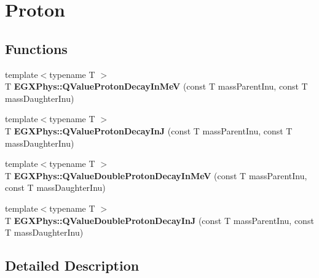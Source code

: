 \hypertarget{group___e_g_x_phys-_q_value-_proton}{}\section{Proton}
\label{group___e_g_x_phys-_q_value-_proton}
\subsection*{Functions}
\begin{DoxyCompactItemize}
\item 
\mbox{\label{group___e_g_x_phys-_q_value-_proton_gadb53ee1b917c5a6a5d17443872f72c04}} 
{\footnotesize template$<$typename T $>$ }\\T {\bfseries E\+G\+X\+Phys\+::\+Q\+Value\+Proton\+Decay\+In\+MeV} (const T mass\+Parent\+Inu, const T mass\+Daughter\+Inu)
\item 
\mbox{\label{group___e_g_x_phys-_q_value-_proton_ga60619e9c1249b20fa96fc24b27a117bb}} 
{\footnotesize template$<$typename T $>$ }\\T {\bfseries E\+G\+X\+Phys\+::\+Q\+Value\+Proton\+Decay\+InJ} (const T mass\+Parent\+Inu, const T mass\+Daughter\+Inu)
\item 
\mbox{\label{group___e_g_x_phys-_q_value-_proton_ga1c6352b3ffeb132afe092dd6e9249dde}} 
{\footnotesize template$<$typename T $>$ }\\T {\bfseries E\+G\+X\+Phys\+::\+Q\+Value\+Double\+Proton\+Decay\+In\+MeV} (const T mass\+Parent\+Inu, const T mass\+Daughter\+Inu)
\item 
\mbox{\label{group___e_g_x_phys-_q_value-_proton_ga2e778fe3f26cf7f03ea1b5734b9564d8}} 
{\footnotesize template$<$typename T $>$ }\\T {\bfseries E\+G\+X\+Phys\+::\+Q\+Value\+Double\+Proton\+Decay\+InJ} (const T mass\+Parent\+Inu, const T mass\+Daughter\+Inu)
\end{DoxyCompactItemize}


\subsection{Detailed Description}
